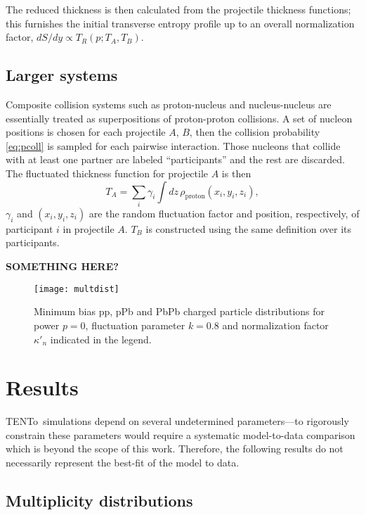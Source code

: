 \documentclass[aps,prl,reprint,amsmath,nofootinbib]{revtex4-1}
\newcommand{\trento}{T\raisebox{-.5ex}{R}ENTo}
\begin{document}
The reduced thickness is then calculated from the projectile thickness functions; this furnishes the initial
transverse entropy profile up to an overall normalization factor, $dS/dy \propto T_R(p; T_A, T_B)$.

\subsection{Larger systems}

Composite collision systems such as proton-nucleus and nucleus-nucleus are essentially treated as
superpositions of proton-proton collisions.  A set of nucleon positions is chosen for each
projectile $A$, $B$, then the collision probability \eqref{eq:pcoll} is sampled for each pairwise interaction.
Those nucleons that collide with at least one partner are labeled ``participants'' and the rest are discarded.
The fluctuated thickness function for projectile $A$ is then
\begin{equation}
  T_A = \sum_i \gamma_i \int dz \, \rho_\text{proton}(x_i, y_i, z_i),
\end{equation}
$\gamma_i$ and $(x_i, y_i, z_i)$ are the random fluctuation factor and position, respectively, of participant
$i$ in projectile $A$.  $T_B$ is constructed using the same definition over its participants.

\textbf{SOMETHING HERE?}


\begin{figure*}[t]
  \texttt{[image: multdist]}
  \caption{
    \label{fig:multdist}
    Minimum bias pp, pPb and PbPb charged particle distributions for power $p=0$, fluctuation parameter
    $k=0.8$ and normalization factor $\kappa'_n$ indicated in the legend.
  }
\end{figure*}


\section{Results}

\trento\ simulations depend on several undetermined parameters---to rigorously constrain these parameters
would require a systematic model-to-data comparison which is beyond the scope of this work.  Therefore, the
following results do not necessarily represent the best-fit of the model to data.

\subsection{Multiplicity distributions}
\end{document}
